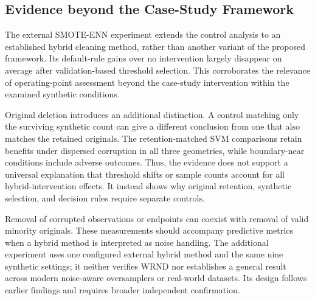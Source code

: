 \subsection{Evidence beyond the Case-Study Framework}
The external SMOTE-ENN experiment extends the control analysis to an established hybrid cleaning method, rather than another variant of the proposed framework. Its default-rule gains over no intervention largely disappear on average after validation-based threshold selection. This corroborates the relevance of operating-point assessment beyond the case-study intervention within the examined synthetic conditions.

Original deletion introduces an additional distinction. A control matching only the surviving synthetic count can give a different conclusion from one that also matches the retained originals. The retention-matched SVM comparisons retain benefits under dispersed corruption in all three geometries, while boundary-near conditions include adverse outcomes. Thus, the evidence does not support a universal explanation that threshold shifts or sample counts account for all hybrid-intervention effects. It instead shows why original retention, synthetic selection, and decision rules require separate controls.

Removal of corrupted observations or endpoints can coexist with removal of valid minority originals. These measurements should accompany predictive metrics when a hybrid method is interpreted as noise handling. The additional experiment uses one configured external hybrid method and the same nine synthetic settings; it neither verifies WRND nor establishes a general result across modern noise-aware oversamplers or real-world datasets. Its design follows earlier findings and requires broader independent confirmation.

